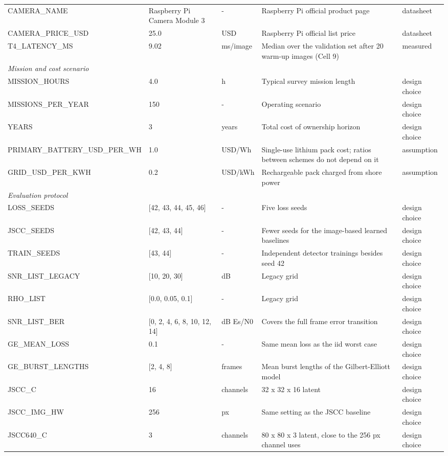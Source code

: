\begin{table}[t]
\begin{tabular}{p{3.3cm}p{2.6cm}p{1.6cm}p{6.6cm}p{2.0cm}}
CAMERA\_NAME & Raspberry Pi Camera Module 3 & - & Raspberry Pi official product page & datasheet \\
CAMERA\_PRICE\_USD & 25.0 & USD & Raspberry Pi official list price & datasheet \\
T4\_LATENCY\_MS & 9.02 & ms/image & Median over the validation set after 20 warm-up images (Cell 9) & measured \\
\multicolumn{5}{l}{\textit{Mission and cost scenario}} \\
MISSION\_HOURS & 4.0 & h & Typical survey mission length & design choice \\
MISSIONS\_PER\_YEAR & 150 & - & Operating scenario & design choice \\
YEARS & 3 & years & Total cost of ownership horizon & design choice \\
PRIMARY\_BATTERY\_USD\_PER\_WH & 1.0 & USD/Wh & Single-use lithium pack cost; ratios between schemes do not depend on it & assumption \\
GRID\_USD\_PER\_KWH & 0.2 & USD/kWh & Rechargeable pack charged from shore power & assumption \\
\multicolumn{5}{l}{\textit{Evaluation protocol}} \\
LOSS\_SEEDS & [42, 43, 44, 45, 46] & - & Five loss seeds & design choice \\
JSCC\_SEEDS & [42, 43, 44] & - & Fewer seeds for the image-based learned baselines & design choice \\
TRAIN\_SEEDS & [43, 44] & - & Independent detector trainings besides seed 42 & design choice \\
SNR\_LIST\_LEGACY & [10, 20, 30] & dB & Legacy grid & design choice \\
RHO\_LIST & [0.0, 0.05, 0.1] & - & Legacy grid & design choice \\
SNR\_LIST\_BER & [0, 2, 4, 6, 8, 10, 12, 14] & dB Es/N0 & Covers the full frame error transition & design choice \\
GE\_MEAN\_LOSS & 0.1 & - & Same mean loss as the iid worst case & design choice \\
GE\_BURST\_LENGTHS & [2, 4, 8] & frames & Mean burst lengths of the Gilbert-Elliott model & design choice \\
JSCC\_C & 16 & channels & 32 x 32 x 16 latent & design choice \\
JSCC\_IMG\_HW & 256 & px & Same setting as the JSCC baseline & design choice \\
JSCC640\_C & 3 & channels & 80 x 80 x 3 latent, close to the 256 px channel uses & design choice \\

\end{tabular}
\end{table}
